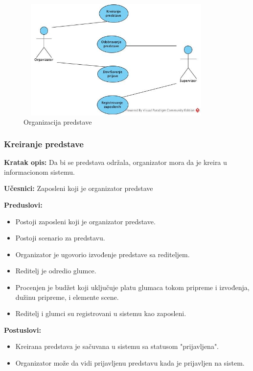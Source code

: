 \documentclass[a4paper]{article}
\begin{document}
\begin{figure}[H]
  \begin{center}
      \includegraphics[width=100mm,height=60mm]{../diagrams/usecase_organizacija_predstave.jpg}
  \end{center}
  \caption{Organizacija predstave}
  \label{usecase_prodaja_karata}
\end{figure}

\subsubsection{Kreiranje predstave} \label{Kreiranje predstave}
\noindent\textbf{Kratak opis:} Da bi se predstava održala, organizator mora da je kreira u informacionom sistemu. 

\noindent\textbf{Učesnici:} Zaposleni koji je organizator predstave

\noindent\textbf{Preduslovi:}
  \begin{itemize}
    \item Postoji zaposleni koji je organizator predstave.
    \item Postoji scenario za predstavu.
    \item Organizator je ugovorio izvođenje predstave sa rediteljem.
    \item Reditelj je odredio glumce.
    \item Procenjen je budžet koji uključuje platu glumaca tokom pripreme i izvođenja, dužinu pripreme, i elemente scene.
    \item Reditelj i glumci su registrovani u sistemu kao zaposleni.
  \end{itemize}

\noindent\textbf{Postuslovi:} 
  \begin{itemize}
    \item Kreirana predstava je sačuvana u sistemu sa statusom "prijavljena".
    \item Organizator može da vidi prijavljenu predstavu kada je prijavljen na sistem.
  \end{itemize}
\end{document}
